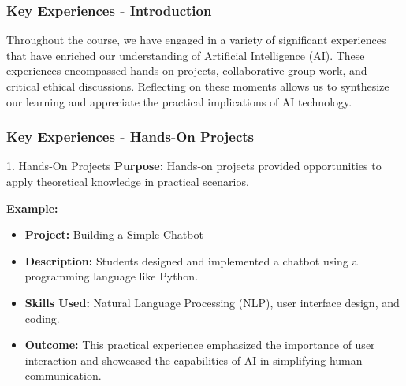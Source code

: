 \documentclass[aspectratio=169]{beamer}
\begin{document}
\begin{frame}[fragile]
  \frametitle{Key Experiences - Introduction}
  Throughout the course, we have engaged in a variety of significant experiences that have enriched our understanding of Artificial Intelligence (AI). 
  These experiences encompassed hands-on projects, collaborative group work, and critical ethical discussions. 
  Reflecting on these moments allows us to synthesize our learning and appreciate the practical implications of AI technology.
\end{frame}

\begin{frame}[fragile]
  \frametitle{Key Experiences - Hands-On Projects}
  \begin{block}{1. Hands-On Projects}
    \textbf{Purpose:} Hands-on projects provided opportunities to apply theoretical knowledge in practical scenarios.
    
    \textbf{Example:}
    \begin{itemize}
      \item \textbf{Project:} Building a Simple Chatbot
      \item \textbf{Description:} Students designed and implemented a chatbot using a programming language like Python.
      \item \textbf{Skills Used:} Natural Language Processing (NLP), user interface design, and coding.
      \item \textbf{Outcome:} This practical experience emphasized the importance of user interaction and showcased the capabilities of AI in simplifying human communication.
    \end{itemize}
  \end{block}
\end{frame}
\end{document}
